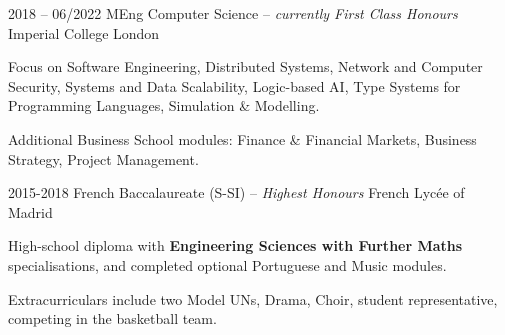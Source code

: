 \begin{entrylist}
    \entry
    {2018 -- 06/2022}
    {MEng Computer Science -- \emph{{\small currently} First Class Honours}}
    {Imperial College London}
    {
        Focus on Software Engineering,
        Distributed Systems,
        Network and Computer Security,
        Systems and Data Scalability,
        Logic-based AI,
        Type Systems for Programming Languages,
        Simulation \& Modelling.

        \para
        Additional Business School modules: Finance \& Financial Markets,
        Business Strategy, Project Management.
    }
    \entry
    {2015-2018}
    {French Baccalaureate (S-SI) --  \emph{Highest Honours}}
    {French Lycée of Madrid}
    {
        High-school diploma with \textbf{Engineering Sciences with Further Maths} specialisations,
        and completed optional Portuguese and Music modules.

        \para
        Extracurriculars include two Model UNs, Drama, Choir, student representative, competing in
    the basketball team.
    }
\end{entrylist}

